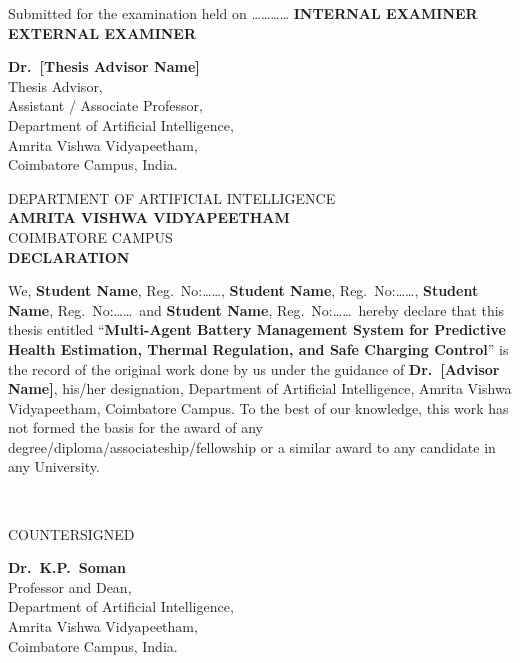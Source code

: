 \documentclass[a4paper, 12pt]{report}
\theoremstyle{definition}
\begin{document}
\vfill
Submitted for the examination held on \ldots\ldots\ldots\ldots
\vfill
\textbf{INTERNAL EXAMINER} \hspace{5cm} \textbf{EXTERNAL EXAMINER}
\vfill
\begin{center}
  \textbf{Dr.~[Thesis Advisor Name]}\\
  Thesis Advisor,\\
  Assistant / Associate Professor,\\
  Department of Artificial Intelligence,\\
  Amrita Vishwa Vidyapeetham,\\
  Coimbatore Campus, India.
\end{center}

\newpage
\begin{center}
  {\large DEPARTMENT OF ARTIFICIAL INTELLIGENCE}\\
  {\Large\textbf{AMRITA VISHWA VIDYAPEETHAM}}\\
  {\large COIMBATORE CAMPUS}\\[2.5cm]
  {\large\textbf{DECLARATION}}\\[0.3cm]
\end{center}
\noindent We, \textbf{Student Name}, Reg.~No:\ldots\ldots,
\textbf{Student Name}, Reg.~No:\ldots\ldots,
\textbf{Student Name}, Reg.~No:\ldots\ldots\ and
\textbf{Student Name}, Reg.~No:\ldots\ldots\ hereby declare that
this thesis entitled
\enquote{\textbf{Multi-Agent Battery Management System for Predictive
Health Estimation, Thermal Regulation, and Safe Charging Control}}
is the record of the original work done by us under the guidance of
\textbf{Dr.~[Advisor Name]}, his/her designation, Department of
Artificial Intelligence, Amrita Vishwa Vidyapeetham, Coimbatore
Campus. To the best of our knowledge, this work has not formed the
basis for the award of any degree/diploma/associateship/fellowship or
a similar award to any candidate in any University.

\vspace{1cm}
\\
\vfill
\begin{center}
  \large{COUNTERSIGNED}\\
\end{center}
\vspace{0.6in}
\begin{center}
  \textbf{Dr.~K.P.~Soman}\\
  Professor and Dean,\\
  Department of Artificial Intelligence,\\
  Amrita Vishwa Vidyapeetham,\\
  Coimbatore Campus, India.
\end{center}
\end{document}
